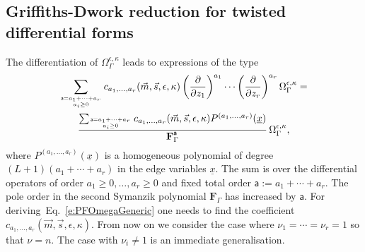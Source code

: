 \documentclass[a4paper,12pt]{article}
\numberwithin{equation}{section}
\numberwithin{figure}{section}
\begin{document}
\subsection{Griffiths-Dwork reduction for twisted differential forms}\label{sec:griff-dwork-reduct}
The    differentiation of $\Omega_\Gamma^{\epsilon,\kappa}$ 
leads  to  expressions of the type 
\begin{multline}\label{e:PDE}
\sum_{\mathsf{a}=a_1+\cdots+a_r\atop
  a_i\geq0}c_{a_1,\dots,a_r}(\vec m,\vec s,\epsilon,\kappa)\left(\partial\over \partial z_1\right)^{a_1}\cdots\left(\partial
  \over\partial z_r\right)^{a_r} \Omega_\Gamma^{\epsilon,\kappa}=\cr
{ \sum_{\mathsf{a}=a_1+\cdots+a_r\atop a_i\geq0}
  c_{a_1,\dots,a_r}(\vec m,\vec s,\epsilon,\kappa)  P^{(a_1,\dots,a_r)}(\underline x)\over \textbf{F}_\Gamma^{\mathsf {a}}}\, \Omega_\Gamma^{\epsilon,\kappa},
\end{multline}
where 
$  P^{(a_1,\dots,a_r)}(\underline x)$ is a
  homogeneous polynomial of degree $(L+1)(a_1+\cdots+a_r)$ in
  the edge variables $\underline x$.
  The sum is over the differential operators of order
  $a_1\geq0 ,\dots, a_r\geq0$ and fixed total order $\mathsf{a}:=a_1+\cdots +a_r$. 
The
  pole order in the second Symanzik polynomial $\textbf{F}_\Gamma$ has increased by
  $\mathsf a$. 
  For deriving~Eq.~\eqref{e:PFOmegaGeneric} one needs to find the
  coefficient $ c_{a_1,\dots,a_r}(\vec m,\vec s,\epsilon,\kappa)$.  From now on we consider the case where
  $\nu_1=\cdots=\nu_r=1$ so that $\nu=n$. The case with $\nu_i\neq1$
  is an immediate generalisation.

  
\end{document}
